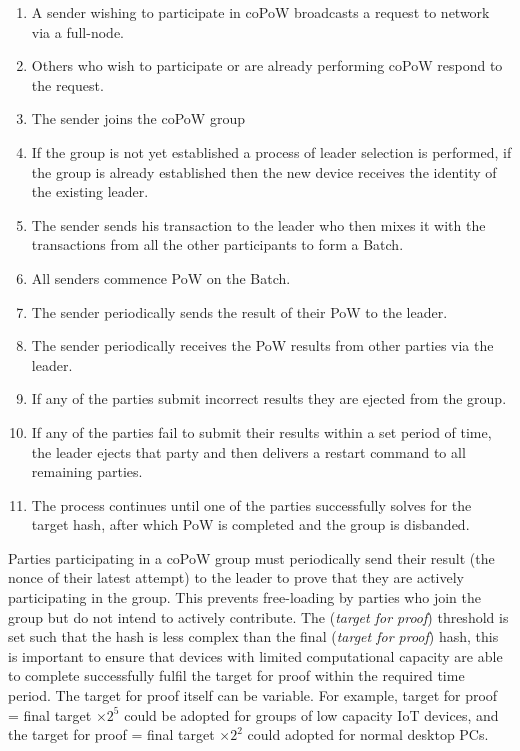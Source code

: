 \documentclass[a4paper,10pt,twocolumn]{article}
\begin{document}
\vspace{-0.5\baselineskip}
\begin{enumerate}
	\setlength\itemsep{0em}
	\item A sender wishing to participate in coPoW broadcasts a request to network via a full-node.
	\item Others who wish to participate or are already performing coPoW respond to the request.
	\item The sender joins the coPoW group
	\item If the group is not yet established a process of leader selection is performed, if the group is already established then 
	the new device receives the identity of the existing leader.
	\item The sender sends his transaction to the leader who then mixes it with the transactions from all the other participants to 
	form a Batch.
	\item All senders commence PoW on the Batch.
	\item The sender periodically sends the result of their PoW to the leader.
	\item The sender periodically receives the PoW results from other parties via the leader. 
	\item If any of the parties submit incorrect results they are ejected from the group.
	\item If any of the parties fail to submit their results within a set period of time, the leader ejects that party and then 
	delivers a restart command to all remaining parties.
	\item The process continues until one of the parties successfully solves for the target hash, after which PoW is completed and 
	the group is disbanded.
\end{enumerate}

Parties participating in a coPoW group must periodically send their result (the nonce of their latest attempt) to the leader to prove 
that they are actively participating in the group. This prevents free-loading by parties who join the group but do not intend to 
actively contribute. The (\emph{target for proof}) threshold is set such that the hash is less complex than the final (\emph{target for 
proof}) hash, this is important to ensure that devices with limited computational capacity are able to complete successfully fulfil the 
target for proof within the required time period. The target for proof itself can be variable. For example, target for proof = final 
target \(  \times 2^5 \) could be adopted for groups of low capacity IoT devices, and the target for proof = final target  \( \times 
2^2 \) could adopted for normal desktop PCs.
\end{document}
